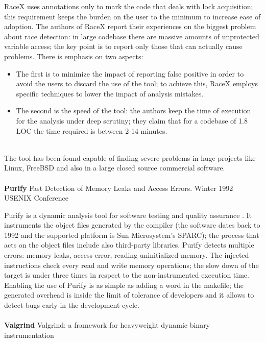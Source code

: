 RaceX uses annotations only to mark the code that deals with lock acquisition; this requirement keeps the burden on the user to the minimum to increase ease of adoption. The authors of RaceX report their experiences on the biggest problem about race detection: in large codebase there are massive amounts of unprotected variable access; the key point is to report only those that can actually cause problems. There is emphasis on two aspects:
\begin{itemize}
    \item The first is to minimize the impact of reporting false positive in order to avoid the users to discard the use of the tool; to achieve this, RaceX employs specific techniques to lower the impact of analysis mistakes.
    \item The second is the speed of the tool: the authors keep the time of execution for the analysis under deep scrutiny; they claim that for a codebase of 1.8 LOC the time required is between 2-14 minutes.  
\end{itemize}
\\
The tool has been found capable of finding severe problems in huge projects like Linux, FreeBSD and also in a large closed source commercial software.
\\
\\
\textbf{Purify} \cite{hastings1992fast} Fast Detection of Memory Leaks and Access Errors. Winter 1992 USENIX Conference
 
 Purify is a dynamic analysis tool for software testing and quality assurance . 
 It instruments the object files generated by the compiler (the software dates back to 1992 and the supported platform is Sun Microsystem's SPARC); the process that acts on the object files  include also third-party libraries. 
 Purify detects multiple errors: memory leaks, access error, reading uninitialized memory. The injected instructions check every read and write memory operations; the slow down of the target is under three times in respect to the non-instrumented execution time. 
 Enabling the use of Purify is as simple as adding a word in the makefile; the generated overhead is inside the limit of tolerance of developers and it allows to detect bugs early in the development cycle.
\\
\\
\textbf{Valgrind} \cite{nethercote2007valgrind} Valgrind: a framework for heavyweight dynamic binary instrumentation

